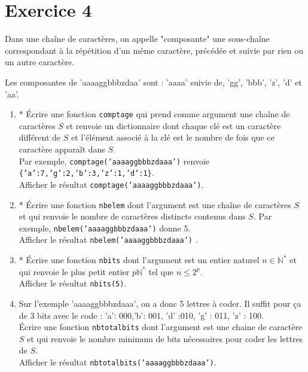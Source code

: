 \section*{Exercice 4}
Dans une chaîne de caractères, on appelle "composante" une sous-chaîne correspondant à la répétition d'un même caractère, précédée et suivie par rien ou un autre caractère.

Les composantes de 'aaaaggbbbzdaa' sont : 'aaaa' suivie de, 'gg', 'bbb', 'z', 'd' et 'aa'.


\begin{enumerate}
\item * Écrire une fonction \texttt{comptage} qui prend comme argument une chaîne de caractères $S$ et renvoie un dictionnaire dont chaque clé est un caractère différent de $S$ et l'élément associé à la clé est le nombre de fois que ce caractère apparaît dans $S$.\\
 Par exemple, \texttt{comptage('aaaaggbbbzdaaa')} renvoie \texttt{\{'a':7,'g':2,'b':3,'z':1,'d':1\}}. \\
 Afficher le résultat \texttt{comptage('aaaaggbbbzdaaa')}.

\item * Écrire une fonction \texttt{nbelem} dont l'argument est une chaîne de caractères $S$ et qui renvoie le nombre de caractères distincts contenus dans $S$. Par exemple, \texttt{nbelem('aaaaggbbbzdaaa')} donne 5.\\
Afficher le résultat \texttt{nbelem('aaaaggbbbzdaaa')} .
 
\item * Écrire une fonction \texttt{nbits} dont l'argument est un entier naturel $n\in\mathbb{N}^*$ et qui renvoie le plus petit entier $p\mathbb{N}^*$ tel que $n \leqslant 2^{p}$.\\
Afficher le résultat \texttt{nbits(5)}.

\item Sur l'exemple 'aaaaggbbbzdaaa', on a donc 5 lettres à coder. Il suffit pour ça de 3 bits avec le code : 'a': 000,'b': 001, 'd' :010, 'g' : 011, 'z' : 100.\\
Écrire une fonction \texttt{nbtotalbits} dont l'argument est une chaine de caractère $S$ et qui renvoie le nombre minimum de bits nécessaires pour coder les lettres de $S$.\\
Afficher le résultat \texttt{nbtotalbits('aaaaggbbbzdaaa')}.


\end{enumerate}
